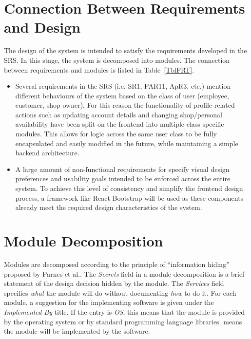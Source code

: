 \documentclass[12pt, titlepage]{article}
\begin{document}
\section{Connection Between Requirements and Design} \label{SecConnection}

The design of the system is intended to satisfy the requirements developed in
the SRS. In this stage, the system is decomposed into modules. The connection
between requirements and modules is listed in Table~\ref{TblFRT}.

\begin{itemize}
    \item Several requirements in the SRS (i.e. SR1, PAR11, ApR3, etc.) mention different behaviours of the system based on the class of user (employee, customer, shop owner). For this reason the functionality of profile-related actions such as updating account details and changing shop/personal availability have been split on the frontend into multiple class specific modules. This allows for logic across the same user class to be fully encapsulated and easily modified in the future, while maintaining a simple backend architecture.
    \item A large amount of non-functional requirements for \progname{} specify visual design preferences and usability goals intended to be enforced across the entire system. To achieve this level of consistency and simplify the frontend design process, a framework like React Bootstrap will be used as these components already meet the required design characteristics of the system.
\end{itemize}

\section{Module Decomposition} \label{SecMD}

Modules are decomposed according to the principle of ``information hiding''
proposed by Parnes et al.. The \emph{Secrets} field in a module
decomposition is a brief statement of the design decision hidden by the
module. The \emph{Services} field specifies \emph{what} the module will do
without documenting \emph{how} to do it. For each module, a suggestion for the
implementing software is given under the \emph{Implemented By} title. If the
entry is \emph{OS}, this means that the module is provided by the operating
system or by standard programming language libraries.  \emph{\progname{}} means the
module will be implemented by the \progname{} software.
\end{document}
